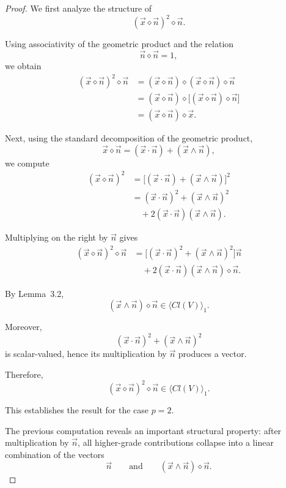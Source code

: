 \documentclass{amsart}
\theoremstyle{plain}
\numberwithin{equation}{section}
\begin{document}
\begin{proof}

We first analyze the structure of
\[
(\vec x\diamond\vec n)^2\diamond\vec n.
\]

Using associativity of the geometric product and the relation
\[
\vec n\diamond\vec n=1,
\]
we obtain
\begin{align*}
(\vec x\diamond\vec n)^2\diamond\vec n
&=
(\vec x\diamond\vec n)
\diamond
(\vec x\diamond\vec n)
\diamond
\vec n \\[4pt]
&=
(\vec x\diamond\vec n)
\diamond
\Big[
(\vec x\diamond\vec n)\diamond\vec n
\Big] \\[4pt]
&=
(\vec x\diamond\vec n)\diamond\vec x.
\end{align*}

Next, using the standard decomposition of the geometric product,
\[
\vec x\diamond\vec n
=
(\vec x\cdot\vec n)
+
(\vec x\wedge\vec n),
\]
we compute
\begin{align*}
(\vec x\diamond\vec n)^2
&=
\Big[
(\vec x\cdot\vec n)
+
(\vec x\wedge\vec n)
\Big]^2 \\[4pt]
&=
(\vec x\cdot\vec n)^2
+
(\vec x\wedge\vec n)^2 \\[4pt]
&\quad
+
2(\vec x\cdot\vec n)
(\vec x\wedge\vec n).
\end{align*}

Multiplying on the right by $\vec n$ gives
\begin{align*}
(\vec x\diamond\vec n)^2\diamond\vec n
&=
\Big[
(\vec x\cdot\vec n)^2
+
(\vec x\wedge\vec n)^2
\Big]\vec n \\[4pt]
&\quad
+
2(\vec x\cdot\vec n)
(\vec x\wedge\vec n)\diamond\vec n.
\end{align*}

By Lemma~3.2,
\[
(\vec x\wedge\vec n)\diamond\vec n
\in
\langle Cl(V)\rangle_1.
\]

Moreover,
\[
(\vec x\cdot\vec n)^2
+
(\vec x\wedge\vec n)^2
\]
is scalar-valued, hence its multiplication by $\vec n$
produces a vector.

Therefore,
\[
(\vec x\diamond\vec n)^2\diamond\vec n
\in
\langle Cl(V)\rangle_1.
\]

This establishes the result for the case $p=2$.

\medskip

The previous computation reveals an important structural property:
after multiplication by $\vec n$, all higher-grade contributions
collapse into a linear combination of the vectors
\[
\vec n
\qquad\text{and}\qquad
(\vec x\wedge\vec n)\diamond\vec n.
\]


\end{proof}
\end{document}
